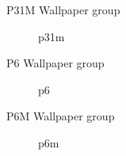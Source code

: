 \begin{frame}{P31M Wallpaper group}
    \begin{figure}
        \centering
        
        \caption{p31m}
        \label{fig:p31m}
    \end{figure}
\end{frame}

\begin{frame}{P6 Wallpaper group}
    \begin{figure}
        \centering
        
        \caption{p6}
        \label{fig:p3}
    \end{figure}
\end{frame}

\begin{frame}{P6M Wallpaper group}
    \begin{figure}
        \centering
        
        \caption{p6m}
        \label{fig:p3m}
    \end{figure}
\end{frame}